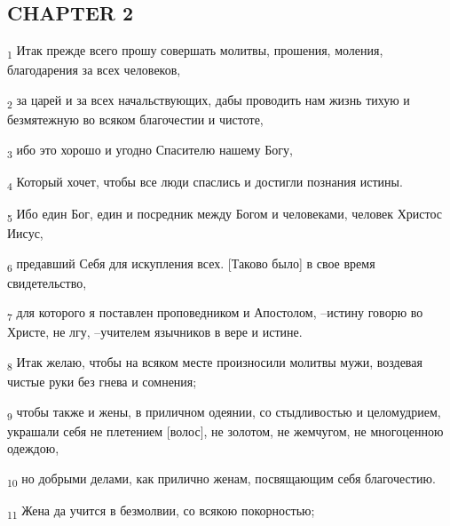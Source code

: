 \subsection{CHAPTER 2}
\begin{tcolorbox}
\textsubscript{1} Итак прежде всего прошу совершать молитвы, прошения, моления, благодарения за всех человеков,
\end{tcolorbox}
\begin{tcolorbox}
\textsubscript{2} за царей и за всех начальствующих, дабы проводить нам жизнь тихую и безмятежную во всяком благочестии и чистоте,
\end{tcolorbox}
\begin{tcolorbox}
\textsubscript{3} ибо это хорошо и угодно Спасителю нашему Богу,
\end{tcolorbox}
\begin{tcolorbox}
\textsubscript{4} Который хочет, чтобы все люди спаслись и достигли познания истины.
\end{tcolorbox}
\begin{tcolorbox}
\textsubscript{5} Ибо един Бог, един и посредник между Богом и человеками, человек Христос Иисус,
\end{tcolorbox}
\begin{tcolorbox}
\textsubscript{6} предавший Себя для искупления всех. [Таково было] в свое время свидетельство,
\end{tcolorbox}
\begin{tcolorbox}
\textsubscript{7} для которого я поставлен проповедником и Апостолом, --истину говорю во Христе, не лгу, --учителем язычников в вере и истине.
\end{tcolorbox}
\begin{tcolorbox}
\textsubscript{8} Итак желаю, чтобы на всяком месте произносили молитвы мужи, воздевая чистые руки без гнева и сомнения;
\end{tcolorbox}
\begin{tcolorbox}
\textsubscript{9} чтобы также и жены, в приличном одеянии, со стыдливостью и целомудрием, украшали себя не плетением [волос], не золотом, не жемчугом, не многоценною одеждою,
\end{tcolorbox}
\begin{tcolorbox}
\textsubscript{10} но добрыми делами, как прилично женам, посвящающим себя благочестию.
\end{tcolorbox}
\begin{tcolorbox}
\textsubscript{11} Жена да учится в безмолвии, со всякою покорностью;
\end{tcolorbox}
